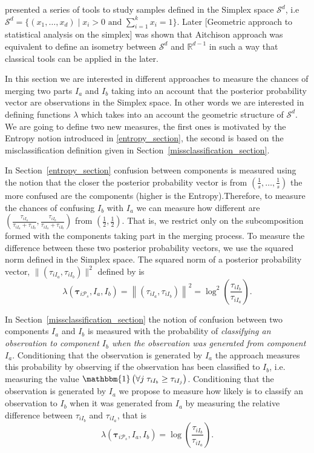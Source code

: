 \documentclass[10pt, a4paper]{article}
\newcommand{\m}[1]{\boldsymbol{#1}}
\begin{document}
\begin{spacing}{1.9}
\cite{aitchison1986statistical} presented a series of tools to study samples defined in the Simplex space $\mathcal{S}^d$, i.e $\mathcal{S}^d = \{ (x_1,\dots, x_d) \;|\; x_i > 0 \text{ and } \sum_{i=1}^k x_i = 1 \}$. Later [Geometric approach to statistical analysis on the simplex] was shown that Aitchison approach was equivalent to define an isometry between $\mathcal{S}^d$ and $\mathbb{R}^{d-1}$ in such a way that classical  tools can be applied in the later. 

In this section we are interested in different approaches to measure the chances of merging two parts $I_a$ and $I_b$ taking into an account that the posterior probability vector are observations in the Simplex space. In other words we are interested in defining functions $\lambda$ which takes into an account the geometric structure of $\mathcal{S}^d$. We are going to define two new measures, the first ones is motivated by the Entropy notion introduced in \ref{entropy_section}, the second is based on the misclassification definition given in Section~\ref{missclassification_section}.


In Section~\ref{entropy_section} confusion between components is measured using the notion that the closer the posterior probability vector is from $(\frac{1}{s}, \dots, \frac{1}{s})$ the more confused are the components (higher is the Entropy).Therefore, to measure the chances of confusing $I_b$ with $I_a$ we can measure how different are $(\frac{\tau_{i I_a}}{\tau_{i I_a} +\tau_{i I_b}}, \frac{\tau_{i I_b}}{\tau_{i I_a} + \tau_{i I_b}})$ from $(\frac{1}{2}, \frac{1}{2})$. That is, we restrict only on the subcomposition formed with the components taking part in the merging process. To measure the difference between these two posterior probability vectors, we use the squared norm defined in the Simplex space. The squared norm of a posterior probability vector, $\| (\tau_{iI_a}, \tau_{iI_b}) \|^2$  defined by \cite{aitchison2002simplicial} is 
\[
\lambda(\m\tau_{i \mathcal{P}_s},  I_a,  I_b) = \left\| (\tau_{iI_a}, \tau_{iI_b}) \right\|^2 = \log^2 \left(\frac{ \tau_{iI_b} }{ \tau_{iI_a} }\right).
\]


In Section~\ref{missclassification_section} the notion of confusion between two components $I_a$ and $I_b$ is measured with the probability of \emph{classifying an observation to component $I_b$ when the observation was generated from component $I_a$}. Conditioning that the observation is generated by $I_a$  the approach measures this probability by observing if the observation has been classified to $I_b$, i.e.  measuring the value $\mathbbm{1}\left( \forall j\; \tau_{i I_{b}} \geq \tau_{i I_j} \right)$. Conditioning that the observation is generated by $I_a$ we propose to measure how likely is to classify an observation to $I_b$ when it was generated from $I_a$ by measuring the relative difference between $\tau_{i I_b}$ and $\tau_{i I_a}$, that is 
\[
\lambda(\m\tau_{i \mathcal{P}_s},  I_a,  I_b) = \log \left(\frac{ \tau_{iI_b} }{ \tau_{iI_a} }\right).
\]


\end{spacing}
\end{document}
